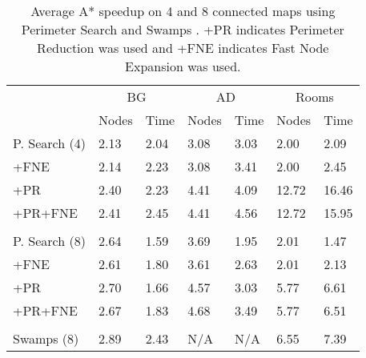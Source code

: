 \begin{table}[ht]
\caption{Average A* speedup on 4 and 8 connected maps using Perimeter Search
and Swamps \cite{pochter10}.
+PR indicates Perimeter Reduction was used and +FNE indicates Fast Node
Expansion was used.}
\label{table-speedup}


\begin{center}
\begin{tabular*}{\columnwidth}{p{1.8cm}m{0.62cm}m{0.62cm}m{0.62cm}m{0.62cm}m{0.62cm}m{0.62cm}}
  \hline
   & \multicolumn{2}{c}{BG} & \multicolumn{2}{c}{AD} & \multicolumn{2}{c}{Rooms}\\
	& Nodes & Time & Nodes & Time & Nodes & Time \\
  \hline

	P. Search (4) & 2.13 & 2.04 & 3.08 & 3.03 & 2.00 & 2.09 \\ 
	+FNE  & 2.14 & 2.23 & 3.08 & 3.41 & 2.00 & 2.45 \\ 
	+PR  & 2.40 & 2.23 & 4.41 & 4.09 & 12.72 & 16.46 \\ 
	+PR+FNE & 2.41 & 2.45 & 4.41 & 4.56 & 12.72 & 15.95 \\  \\ 
	P. Search (8) & 2.64 & 1.59 & 3.69 & 1.95 & 2.01 & 1.47 \\ 
	+FNE  & 2.61 & 1.80 & 3.61 & 2.63 & 2.01 & 2.13 \\ 
	+PR  & 2.70 & 1.66 & 4.57 & 3.03 & 5.77 & 6.61 \\ 
	+PR+FNE  & 2.67 & 1.83 & 4.68 & 3.49 & 5.77 & 6.51 \\  \\
	Swamps (8) & 2.89 & 2.43 & N/A & N/A & 6.55 & 7.39 \\ 
   \hline
\end{tabular*}
\end{center}
\end{table}
